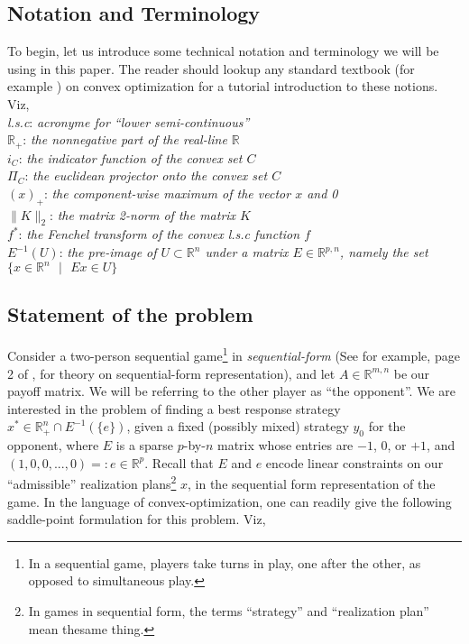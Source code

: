 \documentclass[a4paper,10pt,journal]{IEEEtran}
\begin{document}
\subsection{Notation and Terminology}
To begin, let us introduce some technical notation and terminology we will be using in this paper. The reader should lookup any standard textbook
(for example \cite{boyd2004}) on convex optimization for a tutorial introduction to these notions. Viz,\\
\textit{l.s.c}: \quad \textit{acronyme for ``lower semi-continuous''}\\
$\mathbb{R}_+$: \quad \textit{the nonnegative part of the real-line $\mathbb{R}$}\\
$i_C$: \quad \textit{the indicator function of the convex set $C$}\\
$\Pi_C$: \quad \textit{the euclidean projector onto the convex set $C$}\\
$(x)_+$: \quad \textit{the component-wise maximum of the vector $x$ and 0}\\
$\|K\|_2$: \quad \textit{the matrix 2-norm of the matrix $K$}\\
$f^*$: \quad \textit{the Fenchel transform of the convex l.s.c function $f$}\\
$E^{-1}(U)$: \quad \textit{the pre-image of $U \subset \mathbb{R}^n$ under a matrix $E \in \mathbb{R}^{p,n}$,
namely the set $\{x \in \mathbb{R}^n\text{ }| \text{ }Ex \in U\}$}

\subsection{Statement of the problem}
Consider a two-person sequential game\footnote{In a sequential game, players take turns in play, one after the other,
as opposed to simultaneous play.} in \textit{sequential-form} (See for example, page 2 of \cite{koller-1995},
for theory on sequential-form representation), and let $A \in \mathbb{R}^{m,n}$ be our payoff matrix.
We will be referring to the other player as ``the opponent''. We are interested in the problem of
finding a best response strategy $x^* \in \mathbb{R}_{+}^n \cap E^{-1}(\{e\})$, given a fixed
(possibly mixed) strategy $y_0$ for the opponent, where $E$ is a sparse $p$-by-$n$ matrix whose entries are $-1$, $0$, or $+1$,
and $(1, 0, 0, ..., 0) =: e \in \mathbb{R}^p$. Recall that $E$ and $e$ encode linear constraints on our ``admissible''
realization plans\footnote{In games in sequential form, the terms ``strategy'' and ``realization plan''
mean thesame thing.} $x$, in the sequential form representation of the game.
In the language of convex-optimization,
one can readily give the following saddle-point formulation for this problem. Viz,
\end{document}
